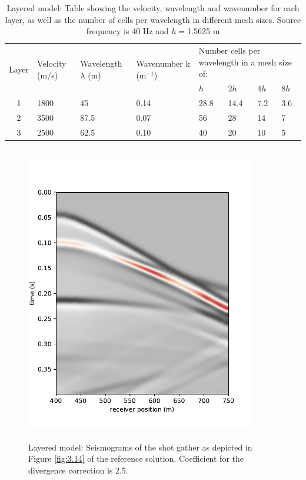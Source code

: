 \begin{table}[h!]
\footnotesize
\centering
    \begin{tabular}{|c|m{2cm}|m{2cm}|m{2cm}| m{1cm}|m{1cm}|m{1cm}|m{1cm}|}
      \hline
      \multirow{2}{*}{Layer} &
      \multirow{2}{2cm}{Velocity (m/s)} &
      \multirow{2}{2cm}{Wavelength \quad $\lambda$ (m)} &
      \multirow{2}{2cm}{Wavenumber  k (m$^{-1}$)} &
         \multicolumn{4}{m{4cm}|}{Number cells per wavelength in a mesh size of:} \\
         & & & & $h$ & $2h$ & $4h$ & $8h$ \\
      \hline
      1 & 1800 & 45 & 0.14 & 28.8 & 14.4 & 7.2 & 3.6\\
      \hline
      2 & 3500 & 87.5 & 0.07 & 56 & 28 & 14 & 7\\
      \hline
      3 & 2500 & 62.5 & 0.10 & 40 & 20 & 10 & 5\\
      \hline
    \end{tabular}
    \caption{Layered model: Table showing the velocity, wavelength and wavenumber for each layer, as well as the number of cells per wavelength in different mesh sizes. Source frequency is 40 Hz and $h=$1.5625 m}
    \label{table:3.1}
\end{table}

 \begin{figure}[h!]
	\centering
	\includegraphics[width=10cm, height=13cm]{Thesis_Edith/figures/layered_model/layer_waves/seismogram_layered.pdf}
	\caption{Layered model: Seismograms of the shot gather as depicted in Figure \ref{fig:3.14} of the reference solution. Coefficient for the divergence correction is 2.5.}
	\label{fig:3.15}
\end{figure}


